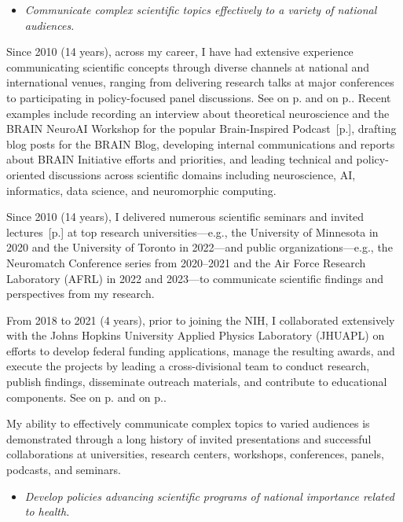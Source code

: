 \documentclass[10pt]{article}
\newcommand{\see}[1]{[\textcolor{hopkinsblue}{p.\pageref{sec:#1}}]}
\newcommand{\cfcf}[2]{\textcolor{hopkinsblue}{See \emph{\nameref{sec:#1}} on
  p.\pageref{sec:#1} and \emph{\nameref{sec:#2}} on p.\pageref{sec:#2}}}
\begin{document}
\begin{itemize}
  \color{hopkinsblue}
  \item \emph{Communicate complex scientific topics effectively to a variety of
national audiences.}
\end{itemize}

Since 2010 (14 years), across my career, I have had extensive experience
communicating scientific concepts through diverse channels at national
and international venues, ranging from delivering research talks at
major conferences to participating in policy-focused panel discussions.
\cfcf{talks}{comms}. Recent examples include recording an interview about
theoretical neuroscience and the BRAIN NeuroAI Workshop for the popular
Brain-Inspired Podcast~\see{media}, drafting blog posts for the BRAIN Blog,
developing internal communications and reports about BRAIN Initiative efforts
and priorities, and leading technical and policy-oriented discussions
across scientific domains including neuroscience, AI, informatics, data
science, and neuromorphic computing. 

Since 2010 (14 years), I delivered numerous scientific seminars and invited
lectures~\see{talks} at top research universities---e.g., the University
of Minnesota in 2020 and the University of Toronto in 2022---and public
organizations---e.g., the Neuromatch Conference series from 2020--2021 and
the Air Force Research Laboratory (AFRL) in 2022 and 2023---to communicate
scientific findings and perspectives from my research.

From 2018 to 2021 (4 years), prior to joining the NIH, I collaborated
extensively with the Johns Hopkins University Applied Physics Laboratory
(JHUAPL) on efforts to develop federal funding applications, manage the
resulting awards, and execute the projects by leading a cross-divisional team
to conduct research, publish findings, disseminate outreach materials, and
contribute to educational components. \cfcf{res}{eduprogram}.

My ability to effectively communicate complex topics to varied audiences is
demonstrated through a long history of invited presentations and successful
collaborations at universities, research centers, workshops, conferences,
panels, podcasts, and seminars.

\begin{itemize}
  \color{hopkinsblue}
  \item \emph{Develop policies advancing scientific programs of national
importance related to health.}
\end{itemize}
\end{document}
